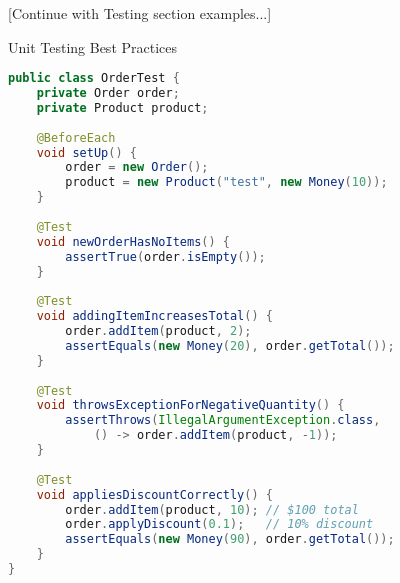 [Continue with Testing section examples...]

\begin{example}{Unit Testing Best Practices}
\begin{lstlisting}[language=Java]
public class OrderTest {
    private Order order;
    private Product product;
    
    @BeforeEach
    void setUp() {
        order = new Order();
        product = new Product("test", new Money(10));
    }
    
    @Test
    void newOrderHasNoItems() {
        assertTrue(order.isEmpty());
    }
    
    @Test
    void addingItemIncreasesTotal() {
        order.addItem(product, 2);
        assertEquals(new Money(20), order.getTotal());
    }
    
    @Test
    void throwsExceptionForNegativeQuantity() {
        assertThrows(IllegalArgumentException.class, 
            () -> order.addItem(product, -1));
    }
    
    @Test
    void appliesDiscountCorrectly() {
        order.addItem(product, 10); // $100 total
        order.applyDiscount(0.1);   // 10% discount
        assertEquals(new Money(90), order.getTotal());
    }
}
\end{lstlisting}
\end{example}


